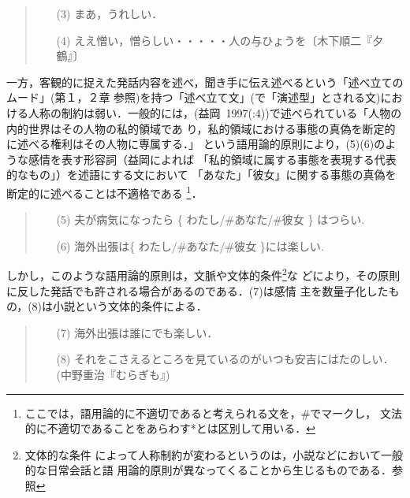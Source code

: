 \vspace{0.3cm}
\begin{quote}
\begin{itemize}
 \item[(3)] まあ，うれしい．
 \item[(4)] ええ憎い，憎らしい・・・・・人の与ひょうを〔木下順二『夕鶴』〕
\end{itemize}
\end{quote}
\vspace{0.3cm}

一方，客観的に捉えた発話内容を述べ，聞き手に伝え述べるという「述べ立ての
ムード」(\cite{仁田1991}第１，２章 参照)を持つ「述べ立て文」(\cite{益岡
1997}で「演述型」とされる文)における人称の制約は弱い．一般的には，(益岡~1997(:4))で述べられている「人物の内的世界はその人物の私的領域であ
り，私的領域における事態の真偽を断定的に述べる権利はその人物に専属する．」
という語用論的原則により，(5)(6)のような感情を表す形容詞（益岡によれば
「私的領域に属する事態を表現する代表的なもの」）を述語にする文において
「あなた」「彼女」に関する事態の真偽を断定的に述べることは不適格である
\footnote{ここでは，語用論的に不適切であると考えられる文を，\#でマークし，
文法的に不適切であることをあらわす*とは区別して用いる．}．

\vspace{0.3cm}
\begin{quote}
\begin{itemize}
 \item[(5)] 夫が病気になったら \{ わたし/\#あなた/\#彼女 \} はつらい.
 \item[(6)] 海外出張は\{ わたし/\#あなた/\#彼女 \}には楽しい.
\end{itemize}
\end{quote}
\vspace{0.3cm}

しかし，このような語用論的原則は，文脈や文体的条件\footnote{文体的な条件
によって人称制約が変わるというのは，小説などにおいて一般的な日常会話と語
用論的原則が異なってくることから生じるものである．\cite{金水1989}参照}な
どにより，その原則に反した発話でも許される場合があるのである．(7)は感情
主を数量子化したもの，(8)は小説という文体的条件による．

\vspace{0.3cm}
\begin{quote}
\begin{itemize}
 \item[(7)] 海外出張は誰にでも楽しい．
 \item[(8)] それをこさえるところを見ているのがいつも安吉にはたのしい．
	    (中野重治『むらぎも』)
\end{itemize}
\end{quote}
\vspace{0.3cm}

